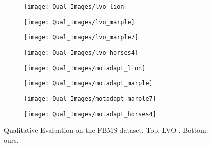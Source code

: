 \documentclass[letterpaper, 10 pt, conference]{ieeeconf}
\begin{document}
\begin{figure*}[ht!]
\centering
\begin{subfigure}{.22\textwidth}
    \texttt{[image: Qual\_Images/lvo\_lion]}
\end{subfigure}\begin{subfigure}{.13\textwidth}
    \texttt{[image: Qual\_Images/lvo\_marple]}
\end{subfigure}\begin{subfigure}{.13\textwidth}
    \texttt{[image: Qual\_Images/lvo\_marple7]}
\end{subfigure}\begin{subfigure}{.18\textwidth}
    \texttt{[image: Qual\_Images/lvo\_horses4]}
\end{subfigure}

\begin{subfigure}{.22\textwidth}
	\texttt{[image: Qual\_Images/motadapt\_lion]}
\end{subfigure}\begin{subfigure}{.13\textwidth}
    \texttt{[image: Qual\_Images/motadapt\_marple]}
\end{subfigure}\begin{subfigure}{.13\textwidth}
    \texttt{[image: Qual\_Images/motadapt\_marple7]}
\end{subfigure}\begin{subfigure}{.18\textwidth}
    \texttt{[image: Qual\_Images/motadapt\_horses4]}
\end{subfigure}

\caption{Qualitative Evaluation on the FBMS dataset. Top: LVO \cite{tokmakov2017learning}. Bottom: ours.}
\label{fig:fbms}
\end{figure*}
\end{document}
